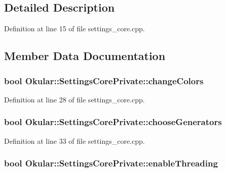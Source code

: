 \subsection{Detailed Description}


Definition at line 15 of file settings\+\_\+core.\+cpp.



\subsection{Member Data Documentation}
\hypertarget{classOkular_1_1SettingsCorePrivate_a779525d859d75bf8d158edfe7b59bd41}{
\subsubsection[{change\+Colors}]{\setlength{\rightskip}{0pt plus 5cm}bool Okular\+::\+Settings\+Core\+Private\+::change\+Colors}}\label{classOkular_1_1SettingsCorePrivate_a779525d859d75bf8d158edfe7b59bd41}


Definition at line 28 of file settings\+\_\+core.\+cpp.

\hypertarget{classOkular_1_1SettingsCorePrivate_af564ef01d5e733d826c719a8694e2031}{
\subsubsection[{choose\+Generators}]{\setlength{\rightskip}{0pt plus 5cm}bool Okular\+::\+Settings\+Core\+Private\+::choose\+Generators}}\label{classOkular_1_1SettingsCorePrivate_af564ef01d5e733d826c719a8694e2031}


Definition at line 33 of file settings\+\_\+core.\+cpp.

\hypertarget{classOkular_1_1SettingsCorePrivate_ac5767e8816765ebbbb42facce4ac649c}{
\subsubsection[{enable\+Threading}]{\setlength{\rightskip}{0pt plus 5cm}bool Okular\+::\+Settings\+Core\+Private\+::enable\+Threading}}\label{classOkular_1_1SettingsCorePrivate_ac5767e8816765ebbbb42facce4ac649c}


